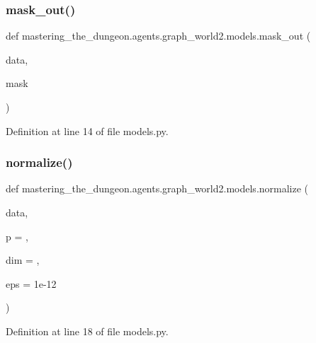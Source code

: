 \subsubsection{\texorpdfstring{mask\+\_\+out()}{mask\_out()}}
{\footnotesize\ttfamily def mastering\+\_\+the\+\_\+dungeon.\+agents.\+graph\+\_\+world2.\+models.\+mask\+\_\+out (\begin{DoxyParamCaption}\item[{}]{data,  }\item[{}]{mask }\end{DoxyParamCaption})}



Definition at line 14 of file models.\+py.

\mbox{\label{namespacemastering__the__dungeon_1_1agents_1_1graph__world2_1_1models_a61f1e78d293d29b242ffa643c7ad45f9}} 
\subsubsection{\texorpdfstring{normalize()}{normalize()}}
{\footnotesize\ttfamily def mastering\+\_\+the\+\_\+dungeon.\+agents.\+graph\+\_\+world2.\+models.\+normalize (\begin{DoxyParamCaption}\item[{}]{data,  }\item[{}]{p = {},  }\item[{}]{dim = {},  }\item[{}]{eps = {\ttfamily 1e-\/12} }\end{DoxyParamCaption})}



Definition at line 18 of file models.\+py.

